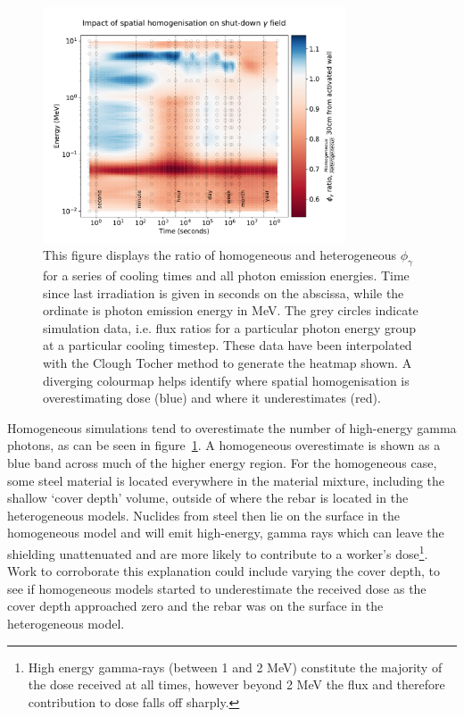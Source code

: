 \begin{figure}[H]
  \centering
  \includegraphics[width=0.8\textwidth]{sddr_nrg.pdf}
  \caption[Heatmap of homogeneous error in SDDR as a function of emitted $\gamma$ energy and cooling time.]{This figure displays the ratio of homogeneous and heterogeneous $\phi_{\gamma}$ for a series of cooling times and all photon emission energies. Time since last irradiation is given in seconds on the abscissa, while the ordinate is photon emission energy in MeV. The grey circles indicate simulation data, i.e. flux ratios for a particular photon energy group at a particular cooling timestep. These data have been interpolated with the Clough Tocher method to generate the heatmap shown. A diverging colourmap helps identify where spatial homogenisation is overestimating dose (blue) and where it underestimates (red).}
  \label{fig:sddr_nrg}
\end{figure}

Homogeneous simulations tend to overestimate the number of high-energy gamma photons, as can be seen in figure~\ref{fig:sddr_nrg}. A homogeneous overestimate is shown as a blue band across much of the higher energy region. For the homogeneous case, some steel material is located everywhere in the material mixture, including the shallow `cover depth' volume, outside of where the rebar is located in the heterogeneous models. Nuclides from steel then lie on the surface in the homogeneous model and will emit high-energy, gamma rays which can leave the shielding unattenuated and are more likely to contribute to a worker's dose\footnote{High energy gamma-rays (between 1 and 2 MeV) constitute the majority of the dose received at all times, however beyond 2 MeV the flux and therefore contribution to dose falls off sharply.}. Work to corroborate this explanation could include varying the cover depth, to see if homogeneous models started to underestimate the received dose as the cover depth approached zero and the rebar was on the surface in the heterogeneous model.

